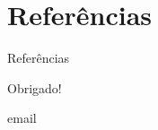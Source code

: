 \documentclass[11pt]{beamer}
\newcommand{\email}{email}
\begin{document}
	\section{Referências}
	\begin{frame}[allowframebreaks]{Referências}
		
	\end{frame}
	
	\begin{frame}
		
		\begin{center}
			Obrigado!
			
			\email
		\end{center}
		
		\begin{figure}[htb]
			\centering
		\end{figure}
		
	\end{frame}
	
\end{document}

